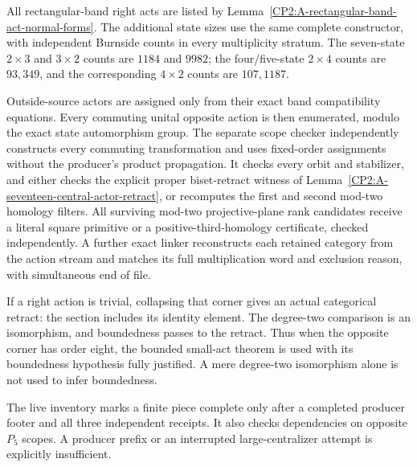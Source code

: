 \begin{remark*}
All rectangular-band right acts are listed by
Lemma~\ref{CP2:A-rectangular-band-act-normal-forms}.
The additional state sizes use the same complete constructor,
with independent Burnside counts in every multiplicity
stratum. The seven-state $2\times3$ and $3\times2$ counts
are $1184$ and $9982$; the four/five-state $2\times4$ counts
are $93,349$, and the corresponding $4\times2$ counts
are $107,1187$.

Outside-source actors are assigned only from their exact
band compatibility equations. Every commuting unital
opposite action is then enumerated, modulo the exact
state automorphism group. The separate scope checker
independently constructs every commuting transformation and
uses fixed-order assignments
without the producer's product propagation. It checks every
orbit and stabilizer, and either checks the explicit proper
biset-retract witness of
Lemma~\ref{CP2:A-seventeen-central-actor-retract}, or
recomputes the first and second mod-two homology filters.
All surviving mod-two projective-plane rank candidates
receive a literal square primitive or a positive-third-homology
certificate, checked independently. A further exact linker
reconstructs each retained category from the action stream
and matches its full multiplication word and exclusion
reason, with simultaneous end of file.

If a right action is trivial, collapsing that corner gives
an actual categorical retract: the section includes its
identity element. The degree-two comparison is an
isomorphism, and boundedness passes to the retract. Thus
when the opposite corner has order eight, the bounded
small-act theorem is used with its boundedness hypothesis
fully justified. A mere degree-two isomorphism alone is
not used to infer boundedness.

The live inventory
marks a finite piece complete only after a completed
producer footer and all three independent receipts. It
also checks dependencies on opposite $P_5$ scopes. A
producer prefix or an interrupted large-centralizer attempt
is explicitly insufficient.
\end{remark*}
